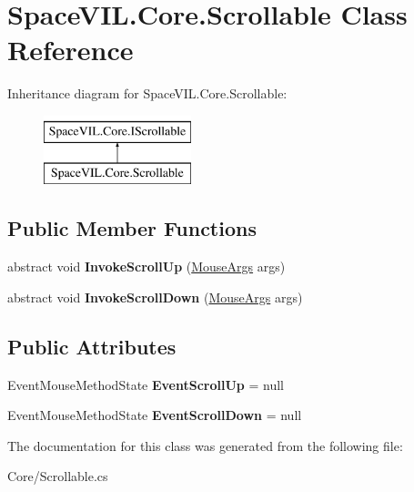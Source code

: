 \hypertarget{class_space_v_i_l_1_1_core_1_1_scrollable}{}\section{Space\+V\+I\+L.\+Core.\+Scrollable Class Reference}
\label{class_space_v_i_l_1_1_core_1_1_scrollable}
Inheritance diagram for Space\+V\+I\+L.\+Core.\+Scrollable\+:\begin{figure}[H]
\begin{center}
\leavevmode
\includegraphics[height=2.000000cm]{class_space_v_i_l_1_1_core_1_1_scrollable}
\end{center}
\end{figure}
\subsection*{Public Member Functions}
\begin{DoxyCompactItemize}
\item 
\mbox{\label{class_space_v_i_l_1_1_core_1_1_scrollable_a901006b24da8ebe5e87083928fb78889}} 
abstract void {\bfseries Invoke\+Scroll\+Up} (\mbox{\hyperlink{class_space_v_i_l_1_1_core_1_1_mouse_args}{Mouse\+Args}} args)
\item 
\mbox{\label{class_space_v_i_l_1_1_core_1_1_scrollable_afb59f83623dada1b3ef1cd86b21a83a2}} 
abstract void {\bfseries Invoke\+Scroll\+Down} (\mbox{\hyperlink{class_space_v_i_l_1_1_core_1_1_mouse_args}{Mouse\+Args}} args)
\end{DoxyCompactItemize}
\subsection*{Public Attributes}
\begin{DoxyCompactItemize}
\item 
\mbox{\label{class_space_v_i_l_1_1_core_1_1_scrollable_afc111e2e4b2530488eb61595817707c1}} 
Event\+Mouse\+Method\+State {\bfseries Event\+Scroll\+Up} = null
\item 
\mbox{\label{class_space_v_i_l_1_1_core_1_1_scrollable_a3dd422899f7af536987168af4afe25f0}} 
Event\+Mouse\+Method\+State {\bfseries Event\+Scroll\+Down} = null
\end{DoxyCompactItemize}


The documentation for this class was generated from the following file\+:\begin{DoxyCompactItemize}
\item 
Core/Scrollable.\+cs\end{DoxyCompactItemize}
